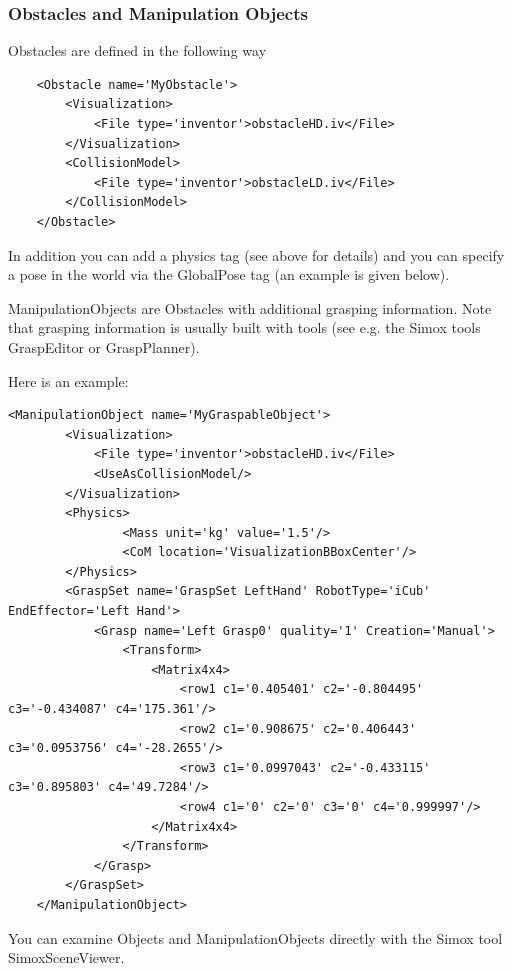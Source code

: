 \subsubsection{Obstacles and Manipulation Objects}
Obstacles are defined in the following way
\begin{lstlisting}
    <Obstacle name='MyObstacle'>
        <Visualization>
            <File type='inventor'>obstacleHD.iv</File>
        </Visualization>
        <CollisionModel>
            <File type='inventor'>obstacleLD.iv</File>
        </CollisionModel>
    </Obstacle>
\end{lstlisting}
In addition you can add a physics tag (see above for details) and you can specify a pose in the world via the GlobalPose tag (an example is given below).
\par
ManipulationObjects are Obstacles with additional grasping information. Note that grasping information is usually built with tools (see e.g. the Simox tools GraspEditor or GraspPlanner).
\par
Here is an example:
\begin{lstlisting}
<ManipulationObject name='MyGraspableObject'>
        <Visualization>
            <File type='inventor'>obstacleHD.iv</File>
            <UseAsCollisionModel/>
        </Visualization>
        <Physics>
                <Mass unit='kg' value='1.5'/>
                <CoM location='VisualizationBBoxCenter'/>
        </Physics>
        <GraspSet name='GraspSet LeftHand' RobotType='iCub' EndEffector='Left Hand'>
            <Grasp name='Left Grasp0' quality='1' Creation='Manual'>
                <Transform>
                    <Matrix4x4>
                        <row1 c1='0.405401' c2='-0.804495' c3='-0.434087' c4='175.361'/>
                        <row2 c1='0.908675' c2='0.406443' c3='0.0953756' c4='-28.2655'/>
                        <row3 c1='0.0997043' c2='-0.433115' c3='0.895803' c4='49.7284'/>
                        <row4 c1='0' c2='0' c3='0' c4='0.999997'/>
                    </Matrix4x4>
                </Transform>
            </Grasp>
        </GraspSet>
    </ManipulationObject>
\end{lstlisting}
You can examine Objects and ManipulationObjects directly with the Simox tool SimoxSceneViewer.
